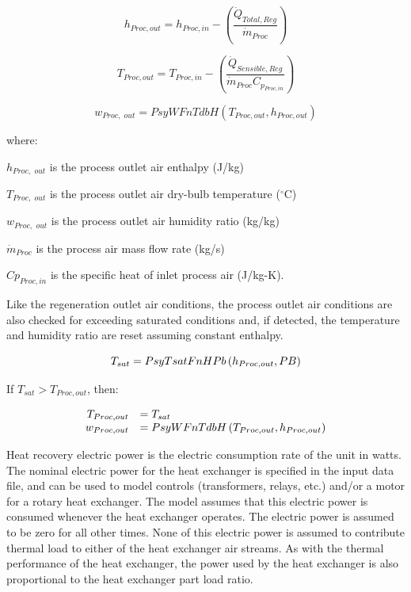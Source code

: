 \begin{equation}
{h_{Proc,out}} = {h_{Proc,in}} - \left( {\frac{\dot{Q}_{Total,Reg}}{\dot{m}_{Proc}}} \right)
\end{equation}

\begin{equation}
{T_{Proc,out}} = {T_{Proc,in}} - \left( {\frac{\dot{Q}_{Sensible,Reg}}{{\dot{m}_{Proc}}C_{p_{Proc,in}}}} \right)
\end{equation}

\begin{equation}
{w_{Proc,\,\,out}} = PsyWFnTdbH\left( {{T_{Proc,out}},{h_{Proc,out}}} \right)
\end{equation}

where:

\({h_{Proc,\,\,out}}\) is the process outlet air enthalpy (J/kg)

\({T_{Proc,\,\,out}}\) is the process outlet air dry-bulb temperature (\(^{\circ}\)C)

\({w_{Proc,\,\,out}}\) is the process outlet air humidity ratio (kg/kg)

\({\dot m_{Proc}}\) is the process air mass flow rate (kg/s)

\(C{p_{Proc,in}}\) is the specific heat of inlet process air (J/kg-K).

Like the regeneration outlet air conditions, the process outlet air conditions are also checked for exceeding saturated conditions and, if detected, the temperature and humidity ratio are reset assuming constant enthalpy.

\begin{equation}
  T_{sat} = PsyTsatFnHPb \left(h_{Proc,out},PB\right)
\end{equation}

If $T_{sat}>T_{Proc,out}$, then:

\begin{equation}
  \begin{array}{rl}
    T_{Proc,out} &= T_{sat} \\
    w_{Proc,out} &= PsyWFnTdbH \left(T_{Proc,out},h_{Proc,out}\right)
  \end{array}
\end{equation}

Heat recovery electric power is the electric consumption rate of the unit in watts. The nominal electric power for the heat exchanger is specified in the input data file, and can be used to model controls (transformers, relays, etc.) and/or a motor for a rotary heat exchanger. The model assumes that this electric power is consumed whenever the heat exchanger operates. The electric power is assumed to be zero for all other times. None of this electric power is assumed to contribute thermal load to either of the heat exchanger air streams. As with the thermal performance of the heat exchanger, the power used by the heat exchanger is also proportional to the heat exchanger part load ratio.

